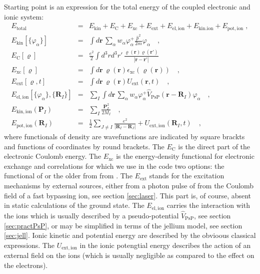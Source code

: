 \documentclass[final,1p]{elsarticle}
\begin{document}
Starting point is an expression for the total energy of the coupled
electronic and ionic system:
\begin{subequations}
\label{eq:Etotal}
\begin{eqnarray}
  E_\mathrm{total}
  &=&
  E_\mathrm{kin}
  +
  E_\mathrm{C}
  +
  E_\mathrm{xc}
  +
  E_\mathrm{ext}
  +
  E_\mathrm{el,ion}
  +
  E_\mathrm{kin.ion}
  +
  E_\mathrm{pot,ion}
  \;,
\\
  E_\mathrm{kin}[\{\varphi_\alpha\}]
  &=&
  \int d\mathbf{r}\,\sum_\alpha w_\alpha
  \varphi_\alpha^+\frac{\hat{p}^2}{2m}\varphi_\alpha^{\mbox{}}
  \quad,
\label{eq:Ekin}
\\
  E_\mathrm{C}[\varrho]
  &=&
  \frac{e^2}{2}\int d^3rd^3r'\,
  \frac{\varrho(\mathbf{r})\varrho(\mathbf{r}')}{|\mathbf{r}-\mathbf{r}'|}
\\
  E_\mathrm{xc}[\varrho]
  &=&
  \int d\mathbf{r}\,\varrho(\mathbf{r})
  \epsilon_\mathrm{xc}\left(\varrho(\mathbf{r})\right)
  \quad,
\\
  E_\mathrm{ext}[\varrho,t]
  &=&
  \int d\mathbf{r}\,\varrho(\mathbf{r})U_\mathrm{ext}(\mathbf{r},t)
  \quad,
\\
  E_\mathrm{el,ion}[\{\varphi_\alpha\},\{\mathbf{R}_I\}]
  &=&
  \sum_I\int d\mathbf{r}\,\sum_\alpha w_\alpha
  \varphi_\alpha^+
  \hat{V}_\mathrm{PsP}(\mathbf{r}-\mathbf{R}_I)\varphi_\alpha^{\mbox{}}
  \quad,
\\
  E_\mathrm{kin,ion}(\mathbf{P}_I)
  &=&
  \sum_I\frac{\mathbf{P}_I^2}{2M_I}
  \quad,
\\
  E_\mathrm{pot,ion}(\mathbf{R}_I)
  &=&
  \frac{1}{2}\sum_{J\neq I}\frac{e^2}{|\mathbf{R}_I-\mathbf{R}_J|}
  +
  U_\mathrm{ext,ion}(\mathbf{R}_I,t)
  \quad,
\end{eqnarray}
\end{subequations}
where functionals of density are wavefunctions are indicated by square
brackts and functions of coordinates by round brackets.  The
$E_\mathrm{C}$ is the direct part of the electronic Coulomb energy.
The $E_\mathrm{xc}$ is the energy-density functional for electronic
exchange and correlations for which we use in the code two options:
the functional of \cite{Per92} or the older from from \cite{Gun76}.
The $E_\mathrm{ext}$ stands for the excitation mechanisms by external
sources, either from a photon pulse of from the Coulomb field of a
fast bypassing ion, see section \ref{sec:laser}. This part is, of
course, absent in static calculations of the ground state.  The
$E_\mathrm{el,ion}$ carries the interaction with the ions which is
usually described by a pseudo-potential $\hat{V}_\mathrm{PsP}$, see
section \ref{sec:practPsP}, or may be simplified in terms of the
jellium model, see section \ref{sec:jell}.  Ionic kinetic and
potential energy are described by the obvioous classical expressions.
The $U_\mathrm{ext,ion}$ in the ionic potengtial energy describes the
action of an external field on the ions (which is usually negligible
as compared to the effect on the electrons).
\end{document}

